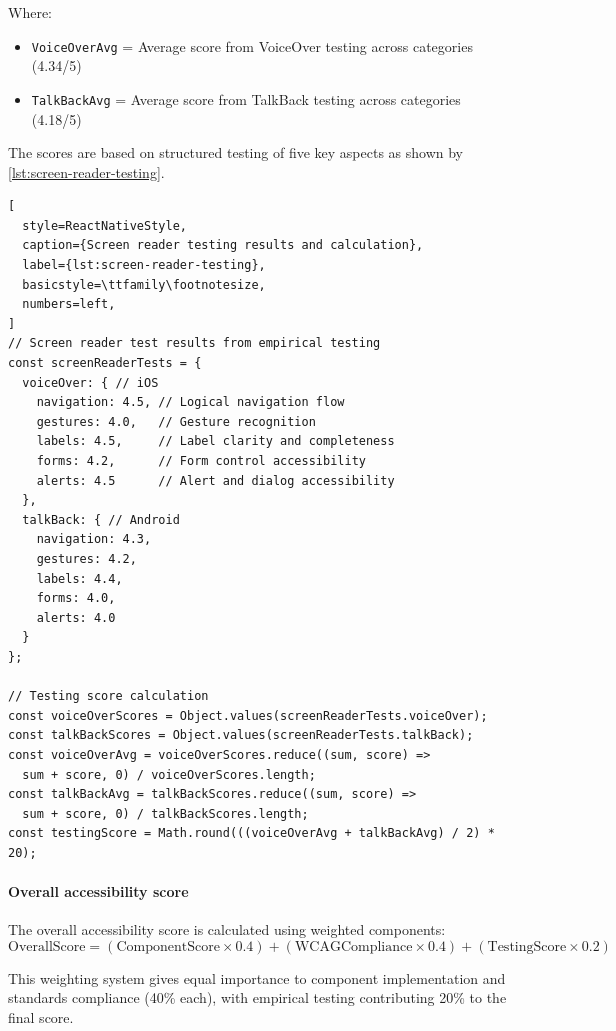 Where:
\begin{itemize}
    \item \texttt{VoiceOverAvg} = Average score from VoiceOver testing across categories (4.34/5)
    \item \texttt{TalkBackAvg} = Average score from TalkBack testing across categories (4.18/5)
\end{itemize}

The scores are based on structured testing of five key aspects as shown by \ref{lst:screen-reader-testing}.

\begin{lstlisting}[
  style=ReactNativeStyle,
  caption={Screen reader testing results and calculation},
  label={lst:screen-reader-testing},
  basicstyle=\ttfamily\footnotesize,
  numbers=left,
]
// Screen reader test results from empirical testing
const screenReaderTests = {
  voiceOver: { // iOS
    navigation: 4.5, // Logical navigation flow
    gestures: 4.0,   // Gesture recognition
    labels: 4.5,     // Label clarity and completeness
    forms: 4.2,      // Form control accessibility
    alerts: 4.5      // Alert and dialog accessibility
  },
  talkBack: { // Android
    navigation: 4.3,
    gestures: 4.2,
    labels: 4.4,
    forms: 4.0,
    alerts: 4.0
  }
};

// Testing score calculation
const voiceOverScores = Object.values(screenReaderTests.voiceOver);
const talkBackScores = Object.values(screenReaderTests.talkBack);
const voiceOverAvg = voiceOverScores.reduce((sum, score) => 
  sum + score, 0) / voiceOverScores.length;
const talkBackAvg = talkBackScores.reduce((sum, score) => 
  sum + score, 0) / talkBackScores.length;
const testingScore = Math.round(((voiceOverAvg + talkBackAvg) / 2) * 20);
\end{lstlisting}

\paragraph{Overall accessibility score}

The overall accessibility score is calculated using weighted components:
\begin{equation}
\text{OverallScore} 
= (\text{ComponentScore} \times 0.4) 
+ (\text{WCAGCompliance} \times 0.4) 
+ (\text{TestingScore} \times 0.2)
\end{equation}

This weighting system gives equal importance to component implementation and standards compliance (40\% each), with empirical testing contributing 20\% to the final score.


